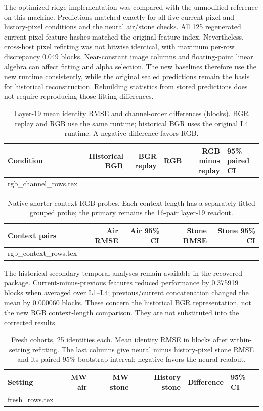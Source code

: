\documentclass{article}
\makeatletter
\let\tablerows\@@input
\makeatother
\begin{document}
The optimized ridge implementation was compared with the unmodified reference on this machine. Predictions matched exactly for all five current-pixel and history-pixel conditions and the neural air/stone checks. All 125 regenerated current-pixel feature hashes matched the original feature index. Nevertheless, cross-host pixel refitting was not bitwise identical, with maximum per-row discrepancy 0.049 blocks. Near-constant image columns and floating-point linear algebra can affect fitting and alpha selection. The new baselines therefore use the new runtime consistently, while the original sealed predictions remain the basis for historical reconstruction. Rebuilding statistics from stored predictions does not require reproducing those fitting differences.

\begin{table}[!htbp]
\caption{Layer-19 mean identity RMSE and channel-order differences (blocks). BGR replay and RGB use the same runtime; historical BGR uses the original L4 runtime. A negative difference favors RGB.}
\label{tab:channel-order}
\centering\small
\begin{tabular}{@{}lrrrrl@{}}
\toprule
Condition & Historical BGR & BGR replay & RGB & RGB minus replay & 95\% paired CI\\
\midrule
\tablerows rgb_channel_rows.tex
\bottomrule
\end{tabular}
\end{table}

\begin{table}[!htbp]
\caption{Native shorter-context RGB probes. Each context length has a separately fitted grouped probe; the primary remains the 16-pair layer-19 readout.}
\label{tab:context-lengths}
\centering\small
\begin{tabular}{@{}lrrrr@{}}
\toprule
Context pairs & Air RMSE & Air 95\% CI & Stone RMSE & Stone 95\% CI\\
\midrule
\tablerows rgb_context_rows.tex
\bottomrule
\end{tabular}
\end{table}

The historical secondary temporal analyses remain available in the recovered package. Current-minus-previous features reduced performance by 0.375919 blocks when averaged over L1--L4; previous/current concatenation changed the mean by 0.000060 blocks. These concern the historical BGR representation, not the new RGB context-length comparison. They are not substituted into the corrected results.


\begin{table}[!htbp]
\caption{Fresh cohorts, 25 identities each. Mean identity RMSE in blocks after within-setting refitting. The last columns give neural minus history-pixel stone RMSE and its paired 95\% bootstrap interval; negative favors the neural readout.}
\label{tab:fresh}
\centering\small
\setlength{\tabcolsep}{4pt}
\begin{tabular}{@{}lrrrrl@{}}
\toprule
Setting & MW air & MW stone & History stone & Difference & 95\% CI\\
\midrule
\tablerows fresh_rows.tex
\bottomrule
\end{tabular}
\end{table}
\end{document}
